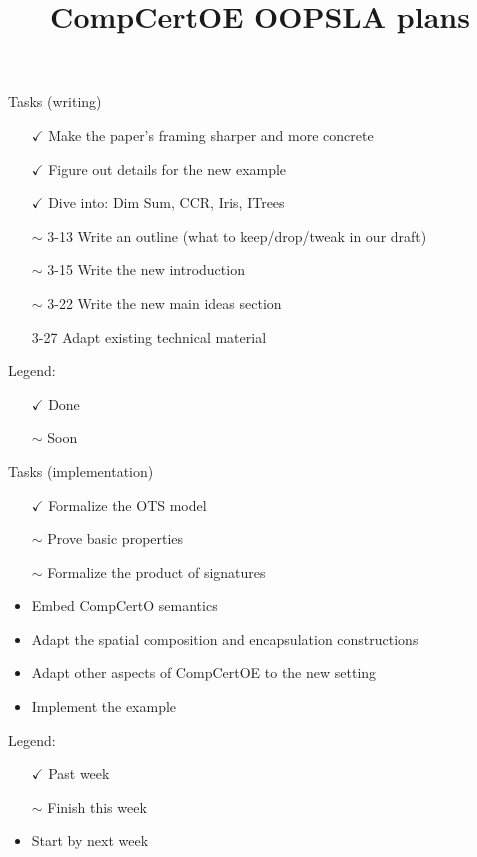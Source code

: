 \documentclass[mathserif,aspectratio=1610]{beamer}
\title{CompCertOE OOPSLA plans}
\begin{document}
\maketitle

\begin{frame}{Tasks (writing)}
\begin{itemize}
\item[$\checkmark$] Make the paper's framing sharper and more concrete
\item[$\checkmark$] Figure out details for the new example
\item[$\checkmark$] Dive into: Dim Sum, CCR, Iris, ITrees 
\item[$\sim$ 3-13] Write an outline (what to keep/drop/tweak in our draft)
\item[$\sim$ 3-15] Write the new introduction
\item[$\sim$ 3-22] Write the new main ideas section
\item[3-27] Adapt existing technical material
\end{itemize}
\vfill
Legend:
\begin{itemize}
\item[$\checkmark$] Done
\item[$\sim$] Soon
\end{itemize}
\end{frame}

\begin{frame}{Tasks (implementation)}
\begin{itemize}
\item[$\checkmark$] Formalize the OTS model
\item[$\sim$] Prove basic properties
\item[$\sim$] Formalize the product of signatures
\item Embed CompCertO semantics
\item Adapt the spatial composition and encapsulation constructions
\item Adapt other aspects of CompCertOE to the new setting
\item Implement the example
\end{itemize}
\vfill
Legend:
\begin{itemize}
\item[$\checkmark$] Past week
\item[$\sim$] Finish this week
\item Start by next week
\end{itemize}
\end{frame}
\end{document}
